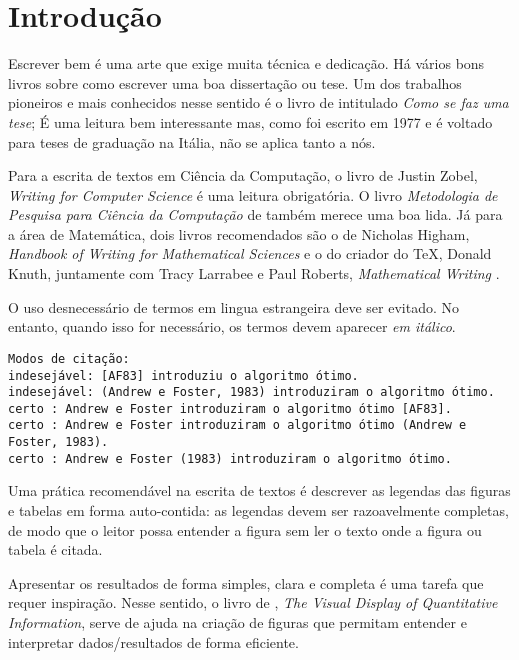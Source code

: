 \chapter{Introdução}
\label{cap:introducao}

Escrever bem é uma arte que exige muita técnica e dedicação. Há vários bons livros
sobre como escrever uma boa dissertação ou tese. Um dos trabalhos pioneiros e mais
conhecidos nesse sentido é o livro de \citet{eco:09} intitulado 
\emph{Como se faz uma tese}; É uma leitura bem interessante mas, como foi escrito 
em 1977 e é voltado para teses de graduação na Itália, não se aplica tanto a nós.

Para a escrita de textos em Ciência da Computação, o livro de Justin Zobel, 
\emph{Writing for Computer Science} \citep{zobel:04} é uma leitura obrigatória. 
O livro \emph{Metodologia de Pesquisa para Ciência da Computação} de 
\citet{waz:09} também merece uma boa lida.
Já para a área de Matemática, dois livros recomendados são o de Nicholas Higham,
\emph{Handbook of Writing for Mathematical Sciences} \citep{Higham:98} e o do criador
do \TeX, Donald Knuth, juntamente com Tracy Larrabee e Paul Roberts, 
\emph{Mathematical Writing} \citep{Knuth:96}.

O uso desnecessário de termos em lingua estrangeira deve ser evitado. No entanto,
quando isso for necessário, os termos devem aparecer \emph{em itálico}.

\begin{small}
\begin{verbatim}
Modos de citação:
indesejável: [AF83] introduziu o algoritmo ótimo.
indesejável: (Andrew e Foster, 1983) introduziram o algoritmo ótimo.
certo : Andrew e Foster introduziram o algoritmo ótimo [AF83].
certo : Andrew e Foster introduziram o algoritmo ótimo (Andrew e Foster, 1983).
certo : Andrew e Foster (1983) introduziram o algoritmo ótimo.
\end{verbatim}
\end{small}

Uma prática recomendável na escrita de textos é descrever as legendas das
figuras e tabelas em forma auto-contida: as legendas devem ser razoavelmente
completas, de modo que o leitor possa entender a figura sem ler o texto onde a
figura ou tabela é citada.  

Apresentar os resultados de forma simples, clara e completa é uma tarefa que
requer inspiração. Nesse sentido, o livro de \citet{tufte01:visualDisplay},
\emph{The Visual Display of Quantitative Information}, serve de ajuda na
criação de figuras que permitam entender e interpretar dados/resultados de forma
eficiente.

